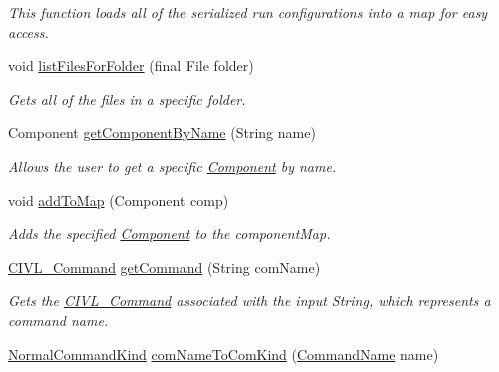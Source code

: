 \begin{DoxyCompactItemize}
\begin{DoxyCompactList}\small\item\em This function loads all of the serialized run configurations into a map for easy access. \end{DoxyCompactList}\item 
void \hyperlink{classedu_1_1udel_1_1cis_1_1vsl_1_1civl_1_1gui_1_1common_1_1GUI__revamp_aeb1ebd53188158c935b9ccd3db6666a9}{list\+Files\+For\+Folder} (final File folder)
\begin{DoxyCompactList}\small\item\em Gets all of the files in a specific folder. \end{DoxyCompactList}\item 
Component \hyperlink{classedu_1_1udel_1_1cis_1_1vsl_1_1civl_1_1gui_1_1common_1_1GUI__revamp_acfe49ec9e3b079d647dc2350c23fe08a}{get\+Component\+By\+Name} (String name)
\begin{DoxyCompactList}\small\item\em Allows the user to get a specific \hyperlink{}{Component} by name. \end{DoxyCompactList}\item 
void \hyperlink{classedu_1_1udel_1_1cis_1_1vsl_1_1civl_1_1gui_1_1common_1_1GUI__revamp_a290b0b6e4c62a9bc469558d4ffbee228}{add\+To\+Map} (Component comp)
\begin{DoxyCompactList}\small\item\em Adds the specified \hyperlink{}{Component} to the component\+Map. \end{DoxyCompactList}\item 
\hyperlink{classedu_1_1udel_1_1cis_1_1vsl_1_1civl_1_1gui_1_1common_1_1CIVL__Command}{C\+I\+V\+L\+\_\+\+Command} \hyperlink{classedu_1_1udel_1_1cis_1_1vsl_1_1civl_1_1gui_1_1common_1_1GUI__revamp_a8d45b5568ec51378eeba217322f38fcc}{get\+Command} (String com\+Name)
\begin{DoxyCompactList}\small\item\em Gets the \hyperlink{classedu_1_1udel_1_1cis_1_1vsl_1_1civl_1_1gui_1_1common_1_1CIVL__Command}{C\+I\+V\+L\+\_\+\+Command} associated with the input String, which represents a command name. \end{DoxyCompactList}\item 
\hyperlink{enumedu_1_1udel_1_1cis_1_1vsl_1_1civl_1_1run_1_1common_1_1NormalCommandLine_1_1NormalCommandKind}{Normal\+Command\+Kind} \hyperlink{classedu_1_1udel_1_1cis_1_1vsl_1_1civl_1_1gui_1_1common_1_1GUI__revamp_ada887a24027d91c9e0d0a271096ba7aa}{com\+Name\+To\+Com\+Kind} (\hyperlink{enumedu_1_1udel_1_1cis_1_1vsl_1_1civl_1_1run_1_1IF_1_1CommandLine_1_1CommandName}{Command\+Name} name)

\end{DoxyCompactItemize}
